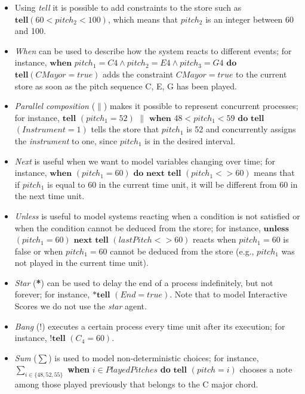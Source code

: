 \documentclass[english]{llncs}
\begin{document}
\begin{itemize}
\item Using \textit{tell} it is possible to add constraints to the store such as $\textbf{tell} (60 < pitch_2 < 100)$, which means that $pitch_2$  is an integer between 60 and 100. 

\item \textit{When} can be used to describe how the system reacts to different events; for instance, 
$\textbf{when}$ $pitch_1=C4 \wedge pitch_2 = E4 \wedge pitch_3 = G4$ $\textbf{do}$   $\textbf{tell} (CMayor = true)$ adds the constraint 
$CMayor = true$ to the current store as soon as the pitch sequence C, E, G  has been played.






\item \textit{Parallel composition} ($\|$) makes it possible to represent concurrent processes; for instance,  
$\textbf{tell}$ $(pitch_1 = 52)$ $\|$ $\textbf{when}$ $48 < pitch_1 < 59$ $\textbf{do}$ $\textbf{tell}$ $(Instrument = 1)$ 
tells the store that $pitch_1$ is 52 and concurrently assigns the \textit{instrument} to one, since $pitch_1$ is in the desired interval.

\item \textit{Next} is useful
when we want to model variables changing over time; for instance, $ \textbf{when}$ $(pitch_1 = 60)$  $\textbf{do}$ $\textbf{next}$  $\textbf{tell}$ $(pitch_1 <> 60)$ means that if $pitch_1$ is equal to 60 in the current time unit,  it will be different from 60 in the next time unit.

\item \textit{Unless} is useful to model systems reacting when a condition is not satisfied or when the condition cannot be deduced from
the store; for instance, $\textbf{unless}$ $(pitch_1 = 60)$  $\textbf{next}$ $\textbf{tell}$ $(lastPitch <> 60)$ reacts when $pitch_1 = 60$ is false or when $pitch_1 = 60$ cannot be deduced from the store (e.g., $pitch_1$ was not played in the current time unit).


\item \textit{Star} (\textbf{*}) can be used to delay the end of a process indefinitely, but not forever; for instance, $* \textbf{tell}$ $(End = true)$. Note that to model Interactive Scores we do not use the \textit{star} agent.

\item \textit{Bang} ($\textbf{!}$)  executes a certain process every time unit after its execution; for instance, $!$$\textbf{tell}$ $(C_4 = 60)$. 

\item \textit{Sum} (\textbf{$\sum$}) is used to model non-deterministic choices; for instance, $\sum_{i \in \{48,52,55\}}$ \textbf{when} $i \in PlayedPitches$
\textbf{do} $\textbf{tell}$ $(pitch = i)$ chooses a note among those played previously that belongs to the C major chord. 

\end{itemize}
\end{document}
